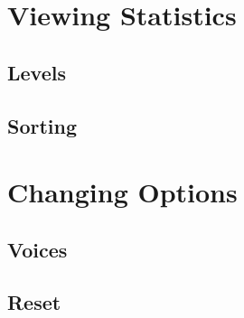 \documentclass[12pt,a4paper,titlepage,onecolumn]{article}
\begin{document}
	\section{Viewing Statistics}
		\subsection{Levels}
		\subsection{Sorting}
		
	\section{Changing Options}
		\subsection{Voices}
		\subsection{Reset}
		
\end{document}
